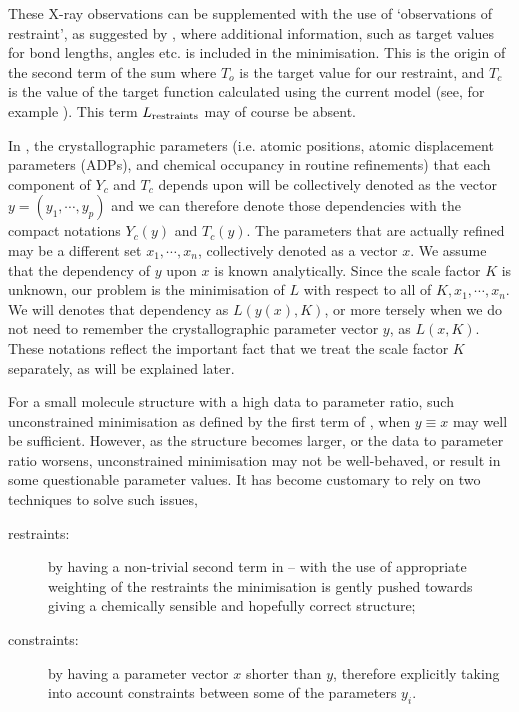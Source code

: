 \documentclass[pdf]{iucr}
\begin{document}
These X-ray observations can be supplemented with the use of `observations of restraint', as suggested by \cite{Waser:1963aa}, where additional information, such as target values for bond lengths, angles etc. is included in the minimisation. This is the origin of the second term of the sum where $T_o$ is the target value for our restraint, and $T_c$ is the value of the target function calculated using the current model (see, for example \cite{Giacovazzo:2002aa,Watkin:2008aa}). This term $L_{\text{restraints}}$ may of course be absent.

In , the crystallographic parameters (i.e. atomic positions, atomic displacement parameters (ADPs), and chemical occupancy in routine refinements) that each component of $Y_c$ and $T_c$ depends upon will be collectively denoted as the vector $y=(y_1, \cdots, y_p)$ and we can therefore denote those dependencies with the compact notations $Y_c(y)$ and $T_c(y)$. The parameters that are actually refined may be a different set $x_1, \cdots, x_n$, collectively denoted as a vector $x$. We assume that the dependency of $y$ upon $x$ is known analytically. Since the scale factor $K$ is unknown, our problem is the minimisation of $L$ with respect to all of $K, x_1, \cdots, x_n$. We will  denotes that dependency as $L(y(x), K)$, or more tersely when we do not need to remember the crystallographic parameter vector $y$, as $L(x, K)$. These notations reflect the important fact that we treat the scale factor $K$ separately, as will be explained later.

For a small molecule structure with a high data to parameter ratio, such unconstrained minimisation as defined by the first term of , when $y \equiv x$ may well be sufficient. However, as the structure becomes larger, or the data to parameter ratio worsens, unconstrained minimisation may not be well-behaved, or result in some questionable parameter values. It has become customary to rely on two techniques to solve such issues,
\begin{description}
\item[restraints:] by having a non-trivial second term in  -- with the use of appropriate weighting of the restraints the minimisation is gently pushed towards giving a chemically sensible and hopefully correct structure;
\item[constraints:] by having a parameter vector $x$ shorter than $y$, therefore explicitly taking into account constraints between some of the parameters $y_i$.
\end{description}
\end{document}
